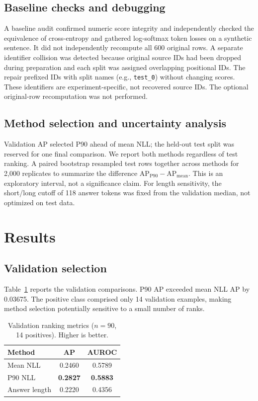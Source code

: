 \documentclass[manuscript,screen]{acmart}
\begin{document}
\subsection{Baseline checks and debugging}
A baseline audit confirmed numeric score integrity and independently checked the equivalence of cross-entropy and gathered log-softmax token losses on a synthetic sentence. It did not independently recompute all 600 original rows. A separate identifier collision was detected because original source IDs had been dropped during preparation and each split was assigned overlapping positional IDs. The repair prefixed IDs with split names (e.g., \texttt{test\_0}) without changing scores. These identifiers are experiment-specific, not recovered source IDs. The optional original-row recomputation was not performed.

\subsection{Method selection and uncertainty analysis}
Validation AP selected P90 ahead of mean NLL; the held-out test split was reserved for one final comparison. We report both methods regardless of test ranking. A paired bootstrap resampled test rows together across methods for 2,000 replicates to summarize the difference $\mathrm{AP}_{\mathrm{P90}}-\mathrm{AP}_{\mathrm{mean}}$. This is an exploratory interval, not a significance claim. For length sensitivity, the short/long cutoff of 118 answer tokens was fixed from the validation median, not optimized on test data.

\section{Results}
\subsection{Validation selection}
Table~\ref{tab:val} reports the validation comparisons. P90 AP exceeded mean NLL AP by 0.03675. The positive class comprised only 14 validation examples, making method selection potentially sensitive to a small number of ranks.
\begin{table}[t]
\caption{Validation ranking metrics ($n=90$, 14 positives). Higher is better.}\label{tab:val}
\centering\begin{tabular}{lcc}\toprule Method & AP & AUROC\\\midrule
Mean NLL & 0.2460 & 0.5789\\
P90 NLL & \textbf{0.2827} & \textbf{0.5883}\\
Answer length & 0.2220 & 0.4356\\\bottomrule
\end{tabular}
\end{table}
\end{document}
